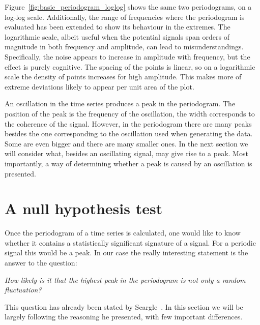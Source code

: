 Figure~\ref{fig:basic_periodogram_loglog} shows the same two periodograms, on a log-log scale.
Additionally, the range of frequencies where the periodogram is evaluated has been extended to show its behaviour in the extremes.
The logarithmic scale, albeit useful when the potential signals span orders of magnitude in both frequency and amplitude, can lead to misunderstandings.
Specifically, the noise appears to increase in amplitude with frequency, but the effect is purely cognitive.
The spacing of the points is linear, so on a logarithmic scale the density of points increases for high amplitude.
This makes more of extreme deviations likely to appear per unit area of the plot.%

An oscillation in the time series produces a peak in the periodogram.
The position of the peak is the frequency of the oscillation, the width corresponds to the coherence of the signal.
However, in the periodogram there are many peaks besides the one corresponding to the oscillation used when generating the data.
Some are even bigger and there are many smaller ones.
In the next section we will consider what, besides an oscillating signal, may give rise to a peak.
Most importantly, a way of determining whether a peak is caused by an oscillation is presented.




\section{A null hypothesis test}
\label{sec:a_null_hypothesis_test}
Once the periodogram of a time series is calculated, one would like to know whether it contains a statistically significant signature of a signal.
For a periodic signal this would be a peak.
In our case the really interesting statement is the answer to the question:
\begin{center}
  \emph{How likely is it that the highest peak in the periodogram is not only a random fluctuation?}
\end{center}
This question has already been stated by Scargle~\cite{Scargle1982}.
In this section we will be largely following the reasoning he presented, with few important differences.

